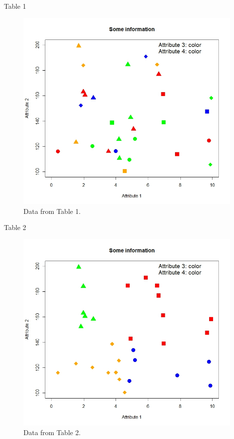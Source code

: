 \documentclass[
  ignorenonframetext,
]{beamer}
\begin{document}
\begin{frame}{Table 1}
\protect\hypertarget{table-1}{}
\begin{figure}
\includegraphics[width=0.85\linewidth]{intro_figs/tab1} \caption{Data from Table 1.}\label{fig:unnamed-chunk-1}
\end{figure}
\end{frame}

\begin{frame}{Table 2}
\protect\hypertarget{table-2}{}
\begin{figure}
\includegraphics[width=0.85\linewidth]{intro_figs/tab2} \caption{Data from Table 2.}\label{fig:unnamed-chunk-2}
\end{figure}
\end{frame}
\end{document}
